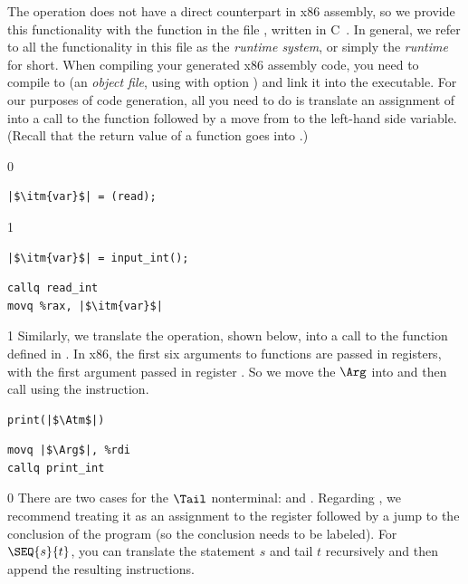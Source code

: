 \documentclass[7x10]{TimesAPriori_MIT}%
\def\racketEd{0}
\def\pythonEd{1}
\def\edition{0}
\numberwithin{theorem}{chapter}
\numberwithin{definition}{chapter}
\numberwithin{equation}{chapter}
\begin{document}
The \READOP{} operation does not have a direct counterpart in x86
assembly, so we provide this functionality with the function
 in the file , written in
C~\citep{Kernighan:1988nx}. In general, we refer to all the
functionality in this file as the \emph{runtime system}, or simply the \emph{runtime} for short. When compiling your
generated x86 assembly code, you need to compile  to
 (an \emph{object file}, using  with option
) and link it into the executable. For our purposes of code
generation, all you need to do is translate an assignment of
\READOP{} into a call to the  function followed by a
move from  to the left-hand side variable.  (Recall that the
return value of a function goes into .)  
\begin{transformation}
{\if\edition\racketEd  
\begin{lstlisting}
|$\itm{var}$| = (read);
\end{lstlisting}
\fi}
{\if\edition\pythonEd
\begin{lstlisting}
|$\itm{var}$| = input_int();
\end{lstlisting}
\fi}
\compilesto
\begin{lstlisting}
callq read_int
movq %rax, |$\itm{var}$|
\end{lstlisting}
\end{transformation}

{\if\edition\pythonEd
%
Similarly, we translate the  operation, shown below, into
a call to the  function defined in .
In x86, the first six arguments to functions are passed in registers,
with the first argument passed in register . So we move the
$\Arg$ into  and then call  using the
 instruction.
\begin{transformation}
\begin{lstlisting}
print(|$\Atm$|)    
\end{lstlisting}
\compilesto
\begin{lstlisting}
movq |$\Arg$|, %rdi
callq print_int  
\end{lstlisting}
\end{transformation}
%
\fi}  

{\if\edition\racketEd
There are two cases for the $\Tail$ nonterminal:  and
. Regarding , we recommend treating it as an
assignment to the  register followed by a jump to the
conclusion of the program (so the conclusion needs to be labeled).
For $\SEQ{s}{t}$, you can translate the statement $s$ and tail $t$
recursively and then append the resulting instructions.
\fi}
\end{document}
